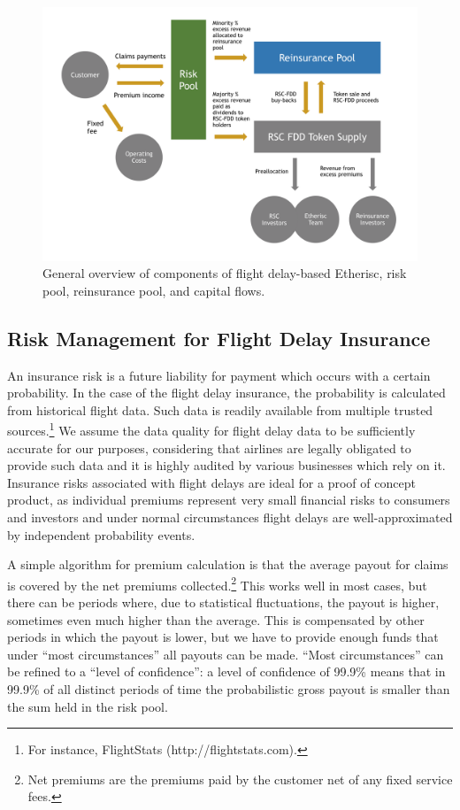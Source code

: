 \documentclass[12pt]{article}
\begin{document}
\begin{figure}[H]
    \begin{center}
        \includegraphics[scale=.5]{etheriscflows}
    \end{center}
    \caption{\footnotesize General overview of components of flight delay-based Etherisc, risk pool, reinsurance pool, and capital flows.}\label{fig1}
\end{figure}

\subsection{Risk Management for Flight Delay Insurance}

An insurance risk is a future liability for payment which occurs with a certain probability. In the case of the flight delay insurance, the probability is calculated from historical flight data. Such data is readily available from multiple trusted sources.\footnote{For instance, FlightStats (http://flightstats.com).} We assume the data quality for flight delay data to be sufficiently accurate for our purposes, considering that airlines are legally obligated to provide such data and it is highly audited by various businesses which rely on it. Insurance risks associated with flight delays are ideal for a proof of concept product, as individual premiums represent very small financial risks to consumers and investors and under normal circumstances flight delays are well-approximated by independent probability events.

A simple algorithm for premium calculation is that the average payout for claims is covered by the net premiums collected.\footnote{Net premiums are the premiums paid by the customer net of any fixed service fees.} This works well in most cases, but there can be periods where, due to statistical fluctuations, the payout is higher, sometimes even much higher than the average. This is compensated by other periods in which the payout is lower, but we have to provide enough funds that under ``most circumstances'' all payouts can be made. “Most circumstances” can be refined to a ``level of confidence'': a level of confidence of 99.9\% means that in 99.9\% of all distinct periods of time the probabilistic gross payout is smaller than the sum held in the risk pool. 
\end{document}
